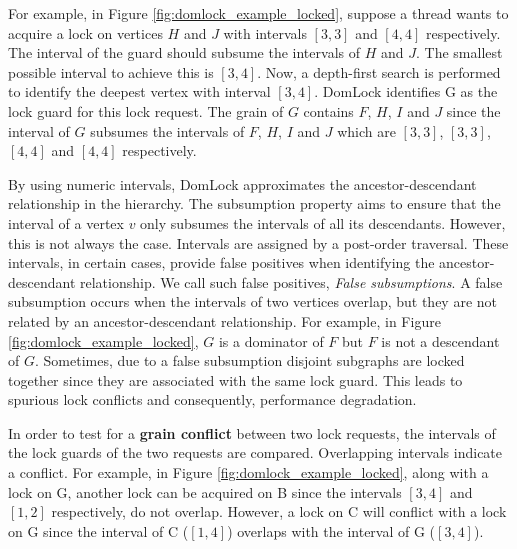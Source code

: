 

For example, in Figure \ref{fig:domlock_example_locked}, suppose a thread wants to acquire a lock on vertices $H$ and $J$ with intervals $[3,3]$ and $[4,4]$ respectively. The interval of the guard should subsume the intervals of $H$ and $J$. The smallest possible interval to achieve this is $[3,4]$. Now, a depth-first search is performed to identify the deepest vertex with interval $[3,4]$. DomLock identifies G as the lock guard for this lock request. The grain of $G$ contains $F$, $H$, $I$ and $J$ since the interval of $G$ subsumes the intervals of $F$, $H$, $I$ and $J$ which are $[3,3]$, $[3,3]$, $[4,4]$ and $[4,4]$ respectively.

By using numeric intervals, DomLock approximates the ancestor-descendant relationship in the hierarchy. The subsumption property aims to ensure that the interval of a vertex $v$ only subsumes the intervals of all its descendants. However, this is not always the case. 
Intervals are assigned by a post-order traversal. These intervals, in certain cases, provide false positives when identifying the ancestor-descendant relationship. We call such false positives, \emph{False subsumptions}. 
A false subsumption occurs when the intervals of two vertices overlap, but they are not related by an ancestor-descendant relationship. 
For example, in Figure \ref{fig:domlock_example_locked}, $G$ is a dominator of $F$ but $F$ is not a descendant of $G$. 
Sometimes, due to a false subsumption disjoint subgraphs are locked together since they are associated with the same lock guard. 
This leads to spurious lock conflicts and consequently, performance degradation. 

In order to test for a \textbf{grain conflict} between two lock requests, the intervals of the lock guards of the two requests are compared. Overlapping intervals indicate a conflict. For example, in Figure \ref{fig:domlock_example_locked}, along with a lock on G, another lock can be acquired on B since the intervals $[3,4]$ and $[1,2]$ respectively, do not overlap. However, a lock on C will conflict with a lock on G since the interval of C ($[1,4]$) overlaps with the interval of G ($[3,4]$).

